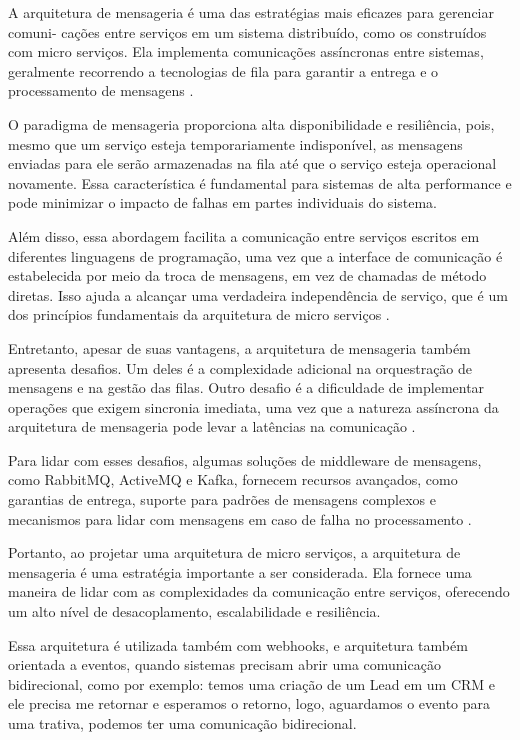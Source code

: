 A arquitetura de mensageria é uma das estratégias mais eficazes para gerenciar comuni-
cações entre serviços em um sistema distribuído, como os construídos com micro serviços.
Ela implementa comunicações assíncronas entre sistemas, geralmente recorrendo a tecnologias de
fila para garantir a entrega e o processamento de mensagens \cite{Boner2019}.

O paradigma de mensageria proporciona alta disponibilidade e resiliência, pois, mesmo que um serviço esteja temporariamente indisponível, as mensagens enviadas para ele serão armazenadas na fila até que o serviço esteja operacional novamente.
Essa característica é fundamental para sistemas de alta performance e pode minimizar o impacto de falhas em partes individuais do sistema.

Além disso, essa abordagem facilita a comunicação entre serviços escritos em diferentes linguagens de programação, uma vez que a interface de comunicação é estabelecida por meio da troca de mensagens, em vez de chamadas de método diretas.
Isso ajuda a alcançar uma verdadeira independência de serviço, que é um dos princípios fundamentais da arquitetura de micro serviços \cite{Newman2015}.

Entretanto, apesar de suas vantagens, a arquitetura de mensageria também apresenta desafios.
Um deles é a complexidade adicional na orquestração de mensagens e na gestão das filas.
Outro desafio é a dificuldade de implementar operações que exigem sincronia imediata, uma vez que a natureza assíncrona da arquitetura de mensageria pode levar a latências na comunicação \cite{Mota2022}.

Para lidar com esses desafios, algumas soluções de middleware de mensagens, como
RabbitMQ, ActiveMQ e Kafka, fornecem recursos avançados, como garantias de entrega, suporte
para padrões de mensagens complexos e mecanismos para lidar com mensagens em caso de
falha no processamento \cite{Kleppmann2017}.

Portanto, ao projetar uma arquitetura de micro serviços, a arquitetura de mensageria é uma
estratégia importante a ser considerada.
Ela fornece uma maneira de lidar com as complexidades da comunicação entre serviços, oferecendo um alto nível de desacoplamento, escalabilidade e resiliência.

Essa arquitetura é utilizada também com webhooks, e arquitetura também orientada a
eventos, quando sistemas precisam abrir uma comunicação bidirecional, como por exemplo:
temos uma criação de um Lead em um CRM e ele precisa me retornar e esperamos o retorno, logo, aguardamos o evento para uma trativa, podemos ter uma comunicação bidirecional.

